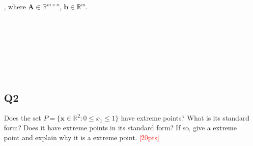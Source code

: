 \documentclass[10pt]{article}
\begin{document}
, where $\bm{A} \in \mathbb{R}^{m \times n}$, $\bm{b} \in \mathbb{R}^{m}$.

~\\
~\\
~\\
~\\
~\\
~\\











\newpage
\subsection{Q2}
Does the set $P = \{ \bm{x} \in \mathbb{R}^{2} : 0 \leq x_{1} \leq 1 \}$ have extreme points? What is its standard form? Does it have extreme points in its standard form? If so, give a extreme point and explain why it is a extreme point.
\textcolor{red}{[20pts]}
\end{document}
